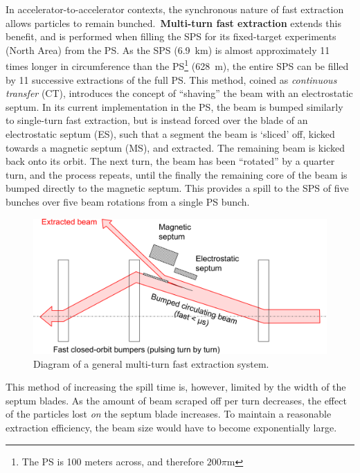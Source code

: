 \documentclass[11pt]{report}
\begin{document}
In accelerator-to-accelerator contexts, the synchronous nature of fast extraction allows particles to remain bunched.~\textbf{Multi-turn fast extraction} extends this benefit, and is performed when filling the SPS for its fixed-target experiments (North Area) from the PS. As the SPS (\qty{6.9}{km}) is almost approximately 11 times longer in circumference than the PS\footnote{The PS is 100 meters across, and therefore $200\pi$\si{m}} (\qty{628}{m}), the entire SPS can be filled by 11 successive extractions of the full PS. This method, coined as \textit{continuous transfer} (CT), introduces the concept of ``shaving'' the beam with an electrostatic septum. In its current implementation in the PS, the beam is bumped similarly to single-turn fast extraction, but is instead forced over the blade of an electrostatic septum (ES), such that a segment the beam is `sliced' off, kicked towards a magnetic septum (MS), and extracted. The remaining beam is kicked back onto its orbit. The next turn, the beam has been ``rotated'' by a quarter turn, and the process repeats, until the finally the remaining core of the beam is bumped directly to the magnetic septum. This provides a spill to the SPS of five bunches over five beam rotations from a single PS bunch.

\begin{figure}[hb]
  \centering
  \includegraphics[width=\linewidth]{fastmulti.png}
  \caption{Diagram of a general multi-turn fast extraction system.~\cite{Fraser:CAS}}
  \label{fig:fast_multi_diagram}
\end{figure}

This method of increasing the spill time is, however, limited by the width of the septum blades. As the amount of beam scraped off per turn decreases, the effect of the particles lost \textit{on} the septum blade increases. To maintain a reasonable extraction efficiency, the beam size would have to become exponentially large.
\end{document}
